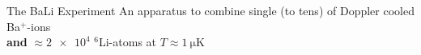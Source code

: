 \begin{frame}[t]{The BaLi Experiment}
    An apparatus to combine single (to tens) of Doppler cooled Ba$^+$-ions\\ 
    \textbf{and} $\approx \num{2e4}$ $^6$Li-atoms at $T\approx\SI{1}{\micro\kelvin}$
\end{frame}
